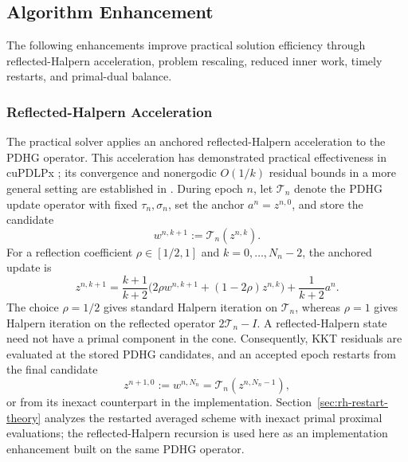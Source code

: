 \documentclass[letterpaper]{article} %
\theoremstyle{definition}
\theoremstyle{remark}
\begin{document}
\subsection{Algorithm Enhancement}
\label{sec:algorithm-enhancement}

The following enhancements improve practical solution efficiency through
reflected-Halpern acceleration, problem rescaling, reduced inner work, timely
restarts, and primal-dual balance.

\subsubsection{Reflected-Halpern Acceleration}
\label{sec:rh-pdhg}

The practical solver applies an anchored reflected-Halpern acceleration to
the PDHG operator. This acceleration has demonstrated practical effectiveness
in cuPDLPx \cite{lu2025cupdlpx}; its convergence and nonergodic $O(1/k)$
residual bounds in a more general setting are established in
\cite{liu2026reflected}. During epoch $n$, let $\mathcal T_n$ denote the PDHG
update operator with fixed
$\tau_n,\sigma_n$, set the anchor $a^n=z^{n,0}$, and store the candidate
\begin{equation}
\label{eq:stored-pdhg-candidate}
    w^{n,k+1}:=\mathcal T_n(z^{n,k}).
\end{equation}
For a reflection coefficient $\rho\in[1/2,1]$ and $k=0,\ldots,N_n-2$, the
anchored update is
\begin{equation}
\label{eq:rh-update}
    z^{n,k+1}
    =
    \frac{k+1}{k+2}
    \bigl(2\rho w^{n,k+1}+(1-2\rho)z^{n,k}\bigr)
    +
    \frac{1}{k+2}a^n .
\end{equation}
The choice $\rho=1/2$ gives standard Halpern iteration on $\mathcal T_n$,
whereas $\rho=1$ gives Halpern iteration on the reflected operator
$2\mathcal T_n-I$.  A reflected-Halpern state need not
have a primal component in the cone.  Consequently, KKT residuals are
evaluated at the stored PDHG candidates, and an accepted epoch restarts from
the final candidate
\begin{equation}
\label{eq:restart-output}
    z^{n+1,0}
    :=
    w^{n,N_n}
    =
    \mathcal T_n(z^{n,N_n-1}),
\end{equation}
or from its inexact counterpart in the implementation.
Section~\ref{sec:rh-restart-theory} analyzes the restarted averaged scheme with
inexact primal proximal evaluations; the reflected-Halpern recursion is used
here as an implementation enhancement built on the same PDHG operator.
\end{document}

